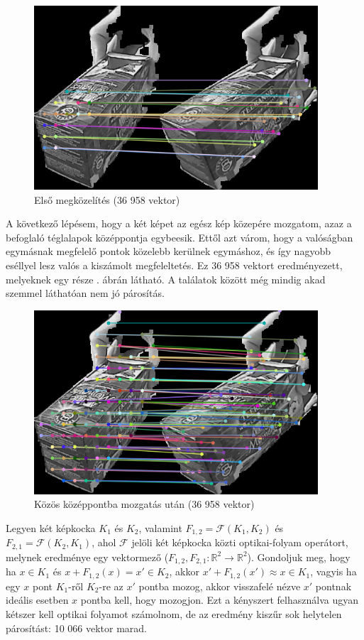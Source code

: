 \begin{figure}[tbh]
\centering
\includegraphics[width=300pt]{figures/vis_bad_0.png}
\caption{Első megközelítés (36 958 vektor) \label{fig:bad0}}
\end{figure}

A következő lépésem, hogy a két képet az egész kép közepére mozgatom, azaz a befoglaló téglalapok középpontja egybeesik. Ettől azt várom, hogy a valóságban egymásnak megfelelő pontok közelebb kerülnek egymáshoz, és így nagyobb eséllyel lesz valós a kiszámolt megfeleltetés. Ez 36 958 vektort eredményezett, melyeknek egy része . ábrán látható. A találatok között még mindig akad szemmel láthatóan nem jó párosítás.

\begin{figure}[tbh]
\centering
\includegraphics[width=300pt]{figures/vis_bad_1.png}
\caption{Közös középpontba mozgatás után (36 958 vektor) \label{fig:bad1}}
\end{figure}

Legyen két képkocka $K_1$ és $K_2$, valamint $F_{1, 2} = \mathcal{F}(K_1, K_2)$ és $F_{2, 1} = \mathcal{F}(K_2, K_1)$, ahol $\mathcal{F}$ jelöli két képkocka közti optikai-folyam operátort, melynek eredménye egy vektormező ($F_{1, 2}, F_{2, 1} : \mathbb{R}^2 \rightarrow \mathbb{R}^2$). Gondoljuk meg, hogy ha $x\in K_1$ és $x + F_{1,2}(x) = x' \in K_2$, akkor $x' + F_{1,2}(x') \approx x \in K_1$, vagyis ha egy $x$ pont $K_1$-ről $K_2$-re az $x'$ pontba mozog, akkor visszafelé nézve $x'$ pontnak ideális esetben $x$ pontba kell, hogy mozogjon. Ezt a kényszert felhasználva ugyan kétszer kell optikai folyamot számolnom, de az eredmény kiszűr sok helytelen párosítást: 10 066 vektor marad.

